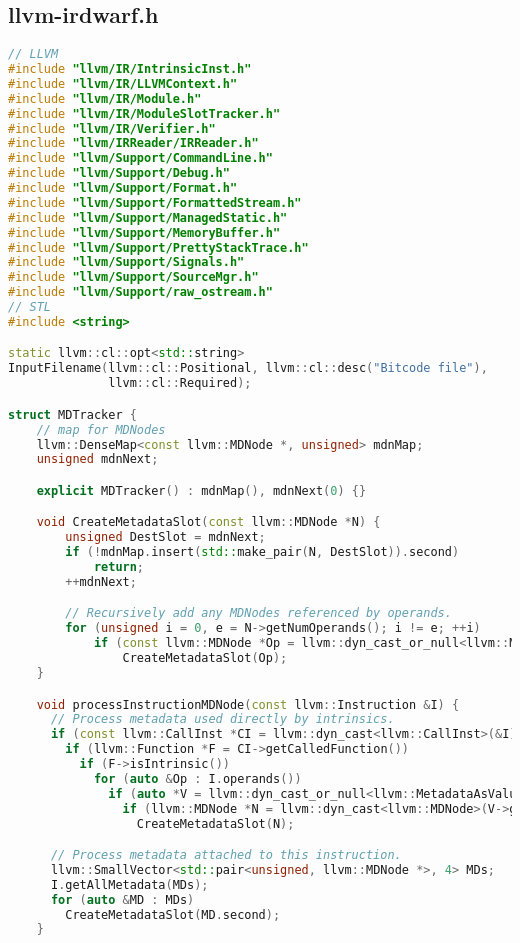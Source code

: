 \documentclass{ctexart}
\begin{document}
\subsection{llvm-irdwarf.h}
\begin{lstlisting}[language=C++]
// LLVM
#include "llvm/IR/IntrinsicInst.h"
#include "llvm/IR/LLVMContext.h"
#include "llvm/IR/Module.h"
#include "llvm/IR/ModuleSlotTracker.h"
#include "llvm/IR/Verifier.h"
#include "llvm/IRReader/IRReader.h"
#include "llvm/Support/CommandLine.h"
#include "llvm/Support/Debug.h"
#include "llvm/Support/Format.h"
#include "llvm/Support/FormattedStream.h"
#include "llvm/Support/ManagedStatic.h"
#include "llvm/Support/MemoryBuffer.h"
#include "llvm/Support/PrettyStackTrace.h"
#include "llvm/Support/Signals.h"
#include "llvm/Support/SourceMgr.h"
#include "llvm/Support/raw_ostream.h"
// STL
#include <string>

static llvm::cl::opt<std::string>
InputFilename(llvm::cl::Positional, llvm::cl::desc("Bitcode file"),
              llvm::cl::Required);

struct MDTracker {
    // map for MDNodes
    llvm::DenseMap<const llvm::MDNode *, unsigned> mdnMap;
    unsigned mdnNext;

    explicit MDTracker() : mdnMap(), mdnNext(0) {}

    void CreateMetadataSlot(const llvm::MDNode *N) {
        unsigned DestSlot = mdnNext;
        if (!mdnMap.insert(std::make_pair(N, DestSlot)).second)
            return;
        ++mdnNext;

        // Recursively add any MDNodes referenced by operands.
        for (unsigned i = 0, e = N->getNumOperands(); i != e; ++i)
            if (const llvm::MDNode *Op = llvm::dyn_cast_or_null<llvm::MDNode>(N->getOperand(i)))
                CreateMetadataSlot(Op);
    }

    void processInstructionMDNode(const llvm::Instruction &I) {
      // Process metadata used directly by intrinsics.
      if (const llvm::CallInst *CI = llvm::dyn_cast<llvm::CallInst>(&I))
        if (llvm::Function *F = CI->getCalledFunction())
          if (F->isIntrinsic())
            for (auto &Op : I.operands())
              if (auto *V = llvm::dyn_cast_or_null<llvm::MetadataAsValue>(Op))
                if (llvm::MDNode *N = llvm::dyn_cast<llvm::MDNode>(V->getMetadata()))
                  CreateMetadataSlot(N);

      // Process metadata attached to this instruction.
      llvm::SmallVector<std::pair<unsigned, llvm::MDNode *>, 4> MDs;
      I.getAllMetadata(MDs);
      for (auto &MD : MDs)
        CreateMetadataSlot(MD.second);
    }


\end{lstlisting}
\end{document}

